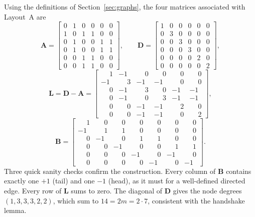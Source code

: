 \documentclass[11pt,a4paper]{article}
\newcommand{\mat}[1]{\mathbf{#1}}
\begin{document}
Using the definitions of Section~\ref{sec:graphs}, the four matrices
associated with Layout~A are
\[
\mat{A} =
\begin{bmatrix}
 0 & 1 & 0 & 0 & 0 & 0 \\
 1 & 0 & 1 & 1 & 0 & 0 \\
 0 & 1 & 0 & 0 & 1 & 1 \\
 0 & 1 & 0 & 0 & 1 & 1 \\
 0 & 0 & 1 & 1 & 0 & 0 \\
 0 & 0 & 1 & 1 & 0 & 0
\end{bmatrix},
\qquad
\mat{D} =
\begin{bmatrix}
 1 & 0 & 0 & 0 & 0 & 0 \\
 0 & 3 & 0 & 0 & 0 & 0 \\
 0 & 0 & 3 & 0 & 0 & 0 \\
 0 & 0 & 0 & 3 & 0 & 0 \\
 0 & 0 & 0 & 0 & 2 & 0 \\
 0 & 0 & 0 & 0 & 0 & 2
\end{bmatrix},
\]
\[
\mat{L} = \mat{D} - \mat{A} =
\begin{bmatrix}
 \phantom{-}1 & -1 & \phantom{-}0 & \phantom{-}0 & \phantom{-}0 & \phantom{-}0 \\
 -1 & \phantom{-}3 & -1 & -1 & \phantom{-}0 & \phantom{-}0 \\
 \phantom{-}0 & -1 & \phantom{-}3 & \phantom{-}0 & -1 & -1 \\
 \phantom{-}0 & -1 & \phantom{-}0 & \phantom{-}3 & -1 & -1 \\
 \phantom{-}0 & \phantom{-}0 & -1 & -1 & \phantom{-}2 & \phantom{-}0 \\
 \phantom{-}0 & \phantom{-}0 & -1 & -1 & \phantom{-}0 & \phantom{-}2
\end{bmatrix},
\]
\[
\mat{B} =
\begin{bmatrix}
 \phantom{-}1 & \phantom{-}0 & \phantom{-}0 & \phantom{-}0 & \phantom{-}0 & \phantom{-}0 & \phantom{-}0 \\
 -1 & \phantom{-}1 & \phantom{-}1 & \phantom{-}0 & \phantom{-}0 & \phantom{-}0 & \phantom{-}0 \\
 \phantom{-}0 & -1 & \phantom{-}0 & \phantom{-}1 & \phantom{-}1 & \phantom{-}0 & \phantom{-}0 \\
 \phantom{-}0 & \phantom{-}0 & -1 & \phantom{-}0 & \phantom{-}0 & \phantom{-}1 & \phantom{-}1 \\
 \phantom{-}0 & \phantom{-}0 & \phantom{-}0 & -1 & \phantom{-}0 & -1 & \phantom{-}0 \\
 \phantom{-}0 & \phantom{-}0 & \phantom{-}0 & \phantom{-}0 & -1 & \phantom{-}0 & -1
\end{bmatrix}.
\]
Three quick sanity checks confirm the construction. Every column of
$\mat{B}$ contains exactly one $+1$ (tail) and one $-1$ (head), as it
must for a well-defined directed edge. Every row of $\mat{L}$ sums to
zero. The diagonal of $\mat{D}$ gives the node degrees
$(1, 3, 3, 3, 2, 2)$, which sum to $14 = 2m = 2 \cdot 7$, consistent
with the handshake lemma.
\end{document}
